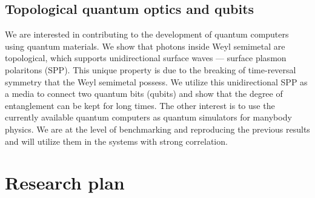 \documentclass[a4paper,11pt]{article}
\begin{document}
\subsection*{Topological quantum optics and qubits}
We are interested in contributing to the development of quantum computers
using quantum materials. We show that photons inside Weyl semimetal
are topological, which supports unidirectional surface waves --- surface
plasmon polaritons (SPP). This unique property is due to the breaking
of time-reversal symmetry that the Weyl semimetal possess. We utilize
this unidirectional SPP as a media to connect two quantum bits (qubits)
and show that the degree of entanglement can be kept for long times.
The other interest is to use the currently available quantum
computers as quantum simulators for manybody physics. We are at the
level of benchmarking and reproducing the previous results and will
utilize them in the systems with strong correlation.


\vspace*{\baselineskip}
\section{Research plan}
\end{document}
